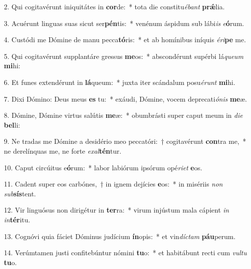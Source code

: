 \item 2. Qui cogitavérunt iniquitátes in \textbf{cor}de:~* tota die constitu\textit{ébant} \textbf{prǽ}lia.
\item 3. Acuérunt linguas suas sicut ser\textbf{pén}tis:~* venénum áspidum sub lábi\textit{is} \textit{e}\textbf{ó}rum.
\item 4. Custódi me Dómine de manu pecca\textbf{tó}ris:~* et ab homínibus iníquis \textit{éri}\textbf{pe} me.
\item 5. Qui cogitavérunt supplantáre gressus \textbf{me}os:~* abscondérunt supérbi lá\textit{queum} \textbf{mi}hi:
\item 6. Et funes extendérunt in \textbf{lá}queum:~* juxta iter scándalum posu\textit{érunt} \textbf{mi}hi.
\item 7. Dixi Dómino: Deus meus \textbf{es} tu:~* exáudi, Dómine, vocem deprecati\textit{ónis} \textbf{me}æ.
\item 8. Dómine, Dómine virtus salútis \textbf{me}æ:~* obumbrásti super caput meum in \textit{die} \textbf{bel}li:
\item 9. Ne tradas me Dómine a desidério meo peccatóri:~† cogitavérunt \textbf{con}tra me,~* ne derelínquas me, ne forte \textit{exal}\textbf{tén}tur.
\item 10. Caput circúitus e\textbf{ó}rum:~* labor labiórum ipsórum opé\textit{riet} \textbf{e}os.
\item 11. Cadent super eos carbónes,~† in ignem dejícies \textbf{e}os:~* in misériis \textit{non} \textit{sub}\textbf{sís}tent.
\item 12. Vir linguósus non dirigétur in \textbf{ter}ra:~* virum injústum mala cápient \textit{in} \textit{in}\textbf{tér}itu.
\item 13. Cognóvi quia fáciet Dóminus judícium \textbf{ín}opis:~* et vin\textit{díctam} \textbf{páu}perum.
\item 14. Verúmtamen justi confitebúntur nómini \textbf{tu}o:~* et habitábunt recti cum \textit{vultu} \textbf{tu}o.

